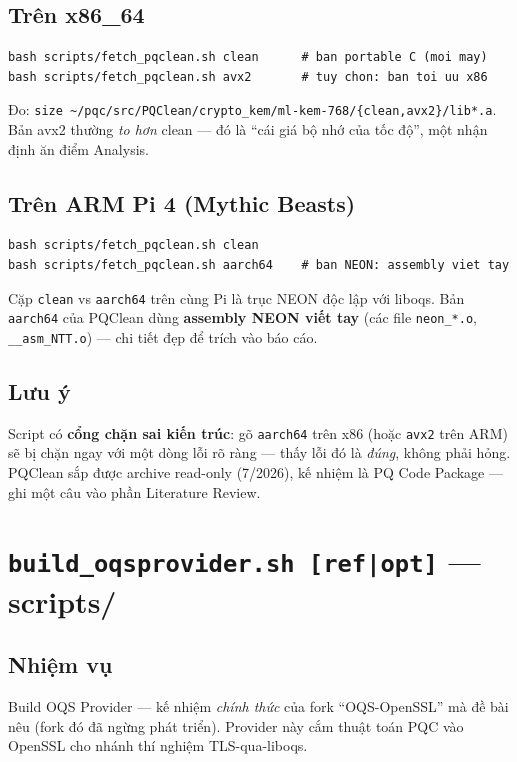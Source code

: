 \documentclass[11pt,a4paper]{article}
\begin{document}
\subsection*{Trên x86\_64}
\begin{lstlisting}
bash scripts/fetch_pqclean.sh clean      # ban portable C (moi may)
bash scripts/fetch_pqclean.sh avx2       # tuy chon: ban toi uu x86
\end{lstlisting}
Đo: \verb|size ~/pqc/src/PQClean/crypto_kem/ml-kem-768/{clean,avx2}/lib*.a|. Bản avx2 thường \emph{to hơn} clean — đó là ``cái giá bộ nhớ của tốc độ'', một nhận định ăn điểm Analysis.

\subsection*{Trên ARM Pi 4 (Mythic Beasts)}
\begin{lstlisting}
bash scripts/fetch_pqclean.sh clean
bash scripts/fetch_pqclean.sh aarch64    # ban NEON: assembly viet tay
\end{lstlisting}
Cặp \verb|clean| vs \verb|aarch64| trên cùng Pi là trục NEON độc lập với liboqs. Bản \verb|aarch64| của PQClean dùng \textbf{assembly NEON viết tay} (các file \verb|neon_*.o|, \verb|__asm_NTT.o|) — chi tiết đẹp để trích vào báo cáo.

\subsection*{Lưu ý}
Script có \textbf{cổng chặn sai kiến trúc}: gõ \verb|aarch64| trên x86 (hoặc \verb|avx2| trên ARM) sẽ bị chặn ngay với một dòng lỗi rõ ràng — thấy lỗi đó là \emph{đúng}, không phải hỏng. PQClean sắp được archive read-only (7/2026), kế nhiệm là PQ Code Package — ghi một câu vào phần Literature Review.

\section{\texttt{build\_oqsprovider.sh [ref|opt]} — \textmd{\normalsize scripts/}}

\subsection*{Nhiệm vụ}
Build OQS Provider — kế nhiệm \emph{chính thức} của fork ``OQS-OpenSSL'' mà đề bài nêu (fork đó đã ngừng phát triển). Provider này cắm thuật toán PQC vào OpenSSL cho nhánh thí nghiệm TLS-qua-liboqs.
\end{document}
